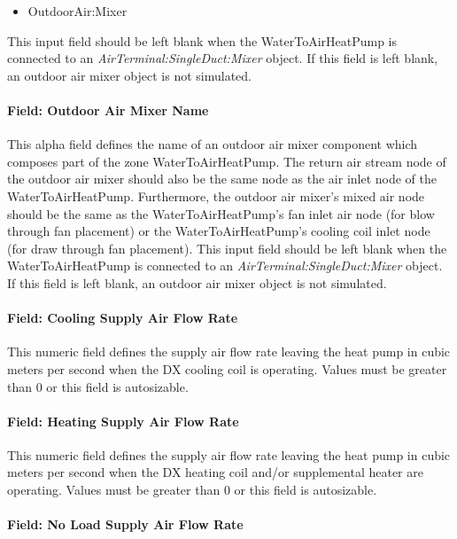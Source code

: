\begin{itemize}
\tightlist
\item
  OutdoorAir:Mixer
\end{itemize}

This input field should be left blank when the WaterToAirHeatPump is connected to an \textit{AirTerminal:SingleDuct:Mixer} object. If this field is left blank, an outdoor air mixer object is not simulated.

\paragraph{Field: Outdoor Air Mixer Name}\label{field-outdoor-air-mixer-name-4}

This alpha field defines the name of an outdoor air mixer component which composes part of the zone WaterToAirHeatPump. The return air stream node of the outdoor air mixer should also be the same node as the air inlet node of the WaterToAirHeatPump. Furthermore, the outdoor air mixer's mixed air node should be the same as the WaterToAirHeatPump's fan inlet air node (for blow through fan placement) or the WaterToAirHeatPump's cooling coil inlet node (for draw through fan placement). This input field should be left blank when the WaterToAirHeatPump is connected to an \textit{AirTerminal:SingleDuct:Mixer} object. If this field is left blank, an outdoor air mixer object is not simulated.

\paragraph{Field: Cooling Supply Air Flow Rate}\label{field-cooling-supply-air-flow-rate-2-001}

This numeric field defines the supply air flow rate leaving the heat pump in cubic meters per second when the DX cooling coil is operating. Values must be greater than 0 or this field is autosizable.

\paragraph{Field: Heating Supply Air Flow Rate}\label{field-heating-supply-air-flow-rate-2-001}

This numeric field defines the supply air flow rate leaving the heat pump in cubic meters per second when the DX heating coil and/or supplemental heater are operating. Values must be greater than 0 or this field is autosizable.

\paragraph{Field: No Load Supply Air Flow Rate}\label{field-no-load-supply-air-flow-rate-2-001}


